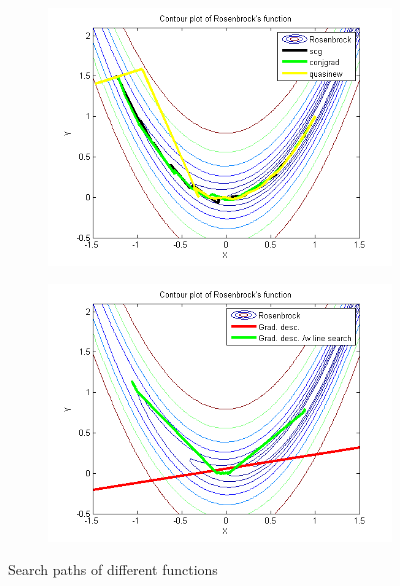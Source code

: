 \documentclass{article}
\begin{document}
\begin{figure}[H]
	\centering
	\begin{subfigure}[b]{0.45\textwidth}
		\includegraphics[width=\textwidth]{rosenbrocktask1.png}
		\label{fig:rosenbrocktask1.1}
	\end{subfigure}
	\begin{subfigure}[b]{0.45\textwidth}
		\includegraphics[width=\textwidth]{rosenbrocktask12.png}
		\label{fig:rosenbrocktask1.2}
	\end{subfigure}	
	\caption{Search paths of different functions}
\end{figure}
\end{document}
